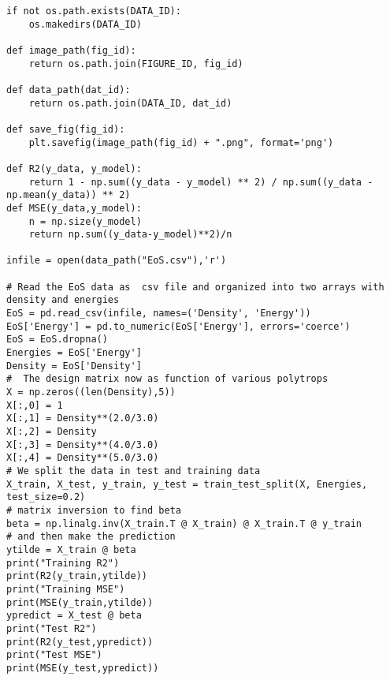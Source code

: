 \documentclass[%
oneside,                 %
final,                   %
10pt]{article}
\newenvironment{doconceexercise}{}{}
\begin{document}
\begin{doconceexercise}
\begin{verbatim}
if not os.path.exists(DATA_ID):
    os.makedirs(DATA_ID)

def image_path(fig_id):
    return os.path.join(FIGURE_ID, fig_id)

def data_path(dat_id):
    return os.path.join(DATA_ID, dat_id)

def save_fig(fig_id):
    plt.savefig(image_path(fig_id) + ".png", format='png')

def R2(y_data, y_model):
    return 1 - np.sum((y_data - y_model) ** 2) / np.sum((y_data - np.mean(y_data)) ** 2)
def MSE(y_data,y_model):
    n = np.size(y_model)
    return np.sum((y_data-y_model)**2)/n

infile = open(data_path("EoS.csv"),'r')

# Read the EoS data as  csv file and organized into two arrays with density and energies
EoS = pd.read_csv(infile, names=('Density', 'Energy'))
EoS['Energy'] = pd.to_numeric(EoS['Energy'], errors='coerce')
EoS = EoS.dropna()
Energies = EoS['Energy']
Density = EoS['Density']
#  The design matrix now as function of various polytrops
X = np.zeros((len(Density),5))
X[:,0] = 1
X[:,1] = Density**(2.0/3.0)
X[:,2] = Density
X[:,3] = Density**(4.0/3.0)
X[:,4] = Density**(5.0/3.0)
# We split the data in test and training data
X_train, X_test, y_train, y_test = train_test_split(X, Energies, test_size=0.2)
# matrix inversion to find beta
beta = np.linalg.inv(X_train.T @ X_train) @ X_train.T @ y_train
# and then make the prediction
ytilde = X_train @ beta
print("Training R2")
print(R2(y_train,ytilde))
print("Training MSE")
print(MSE(y_train,ytilde))
ypredict = X_test @ beta
print("Test R2")
print(R2(y_test,ypredict))
print("Test MSE")
print(MSE(y_test,ypredict))
\end{verbatim}


\end{doconceexercise}
\end{document}
